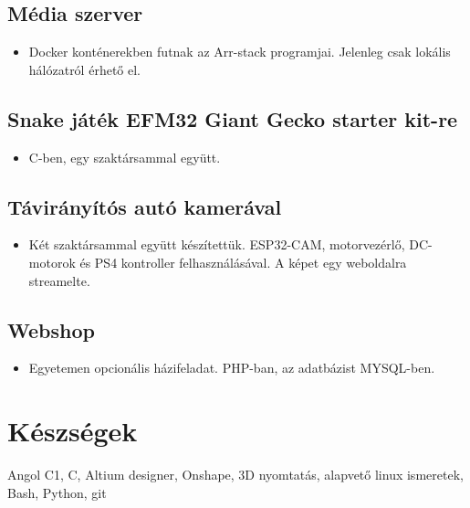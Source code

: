 \documentclass{article}
\begin{document}
\subsection{Média szerver}
\begin{itemize}
  \item Docker konténerekben futnak az Arr-stack programjai. Jelenleg csak lokális hálózatról érhető el.
\end{itemize}

\subsection{Snake játék EFM32 Giant Gecko starter kit-re}
\begin{itemize}
  \item C-ben, egy szaktársammal együtt.
\end{itemize}

\subsection{Távirányítós autó kamerával}
\begin{itemize}
  \item Két szaktársammal együtt készítettük. ESP32-CAM, motorvezérlő, DC-motorok és PS4 kontroller felhasználásával. A képet egy weboldalra streamelte.
\end{itemize}

\subsection{Webshop}
\begin{itemize}
  \item Egyetemen opcionális házifeladat. PHP-ban, az adatbázist MYSQL-ben.
\end{itemize}

\section{\faCogs\enspace Készségek}
\begin{description}
  \item Angol C1, C, Altium designer, Onshape, 3D nyomtatás, alapvető linux ismeretek, Bash, Python, git
\end{description}
\end{document}
